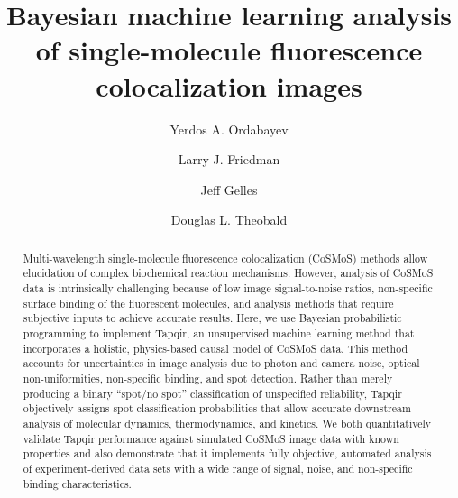 \documentclass[9pt,lineno]{elife}
\title{Bayesian machine learning analysis of single-molecule fluorescence colocalization images}
\author[1]{Yerdos A. Ordabayev}
\author[1]{Larry  J. Friedman}
\author[1*]{Jeff Gelles}
\author[1*]{Douglas L. Theobald}
\affil[1]{Department of Biochemistry, Brandeis University, Waltham, MA 02454 USA}
\begin{document}
\maketitle

\begin{abstract} %
Multi-wavelength single-molecule fluorescence colocalization (CoSMoS) methods allow elucidation of complex biochemical reaction mechanisms. However, analysis of CoSMoS data is intrinsically challenging because of low image signal-to-noise ratios, non-specific surface binding of the fluorescent molecules, and analysis methods that require subjective inputs to achieve accurate results. Here, we use Bayesian probabilistic programming to implement Tapqir, an unsupervised machine learning method that incorporates a holistic, physics-based causal model of CoSMoS data.  This method accounts for uncertainties in image analysis due to photon and camera noise, optical non-uniformities, non-specific binding, and spot detection. Rather than merely producing a binary ``spot/no spot'' classification of unspecified reliability, Tapqir objectively assigns spot classification probabilities that allow accurate downstream analysis of molecular dynamics, thermodynamics, and kinetics.   We both quantitatively validate Tapqir performance against simulated CoSMoS image data with known properties and also demonstrate that it implements fully objective, automated analysis of experiment-derived data sets with a wide range of signal, noise, and non-specific binding characteristics. 
\end{abstract}











% 



\end{document}
